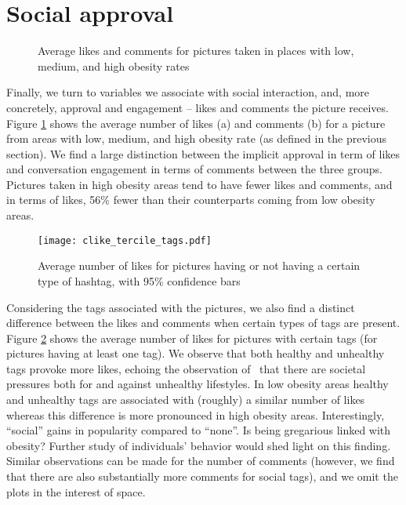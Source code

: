\documentclass{sig-alternate-2013}
\begin{document}
\section{Social approval}
\label{sec:social}


\begin{figure}[t!]
\hfill
{}\hfill
\caption{Average likes and comments for pictures taken in places with low, medium, and high obesity rates}
\label{figure:obesity_likes_comm}
\end{figure}

Finally, we turn to variables we associate with social interaction, and, more concretely, approval and engagement -- likes and comments the picture receives. Figure \ref{figure:obesity_likes_comm} shows the average number of likes (a) and comments (b) for a picture from areas with low, medium, and high obesity rate (as defined in the previous section). We find a large distinction between the implicit approval in term of likes and conversation engagement in terms of comments between the three groups. Pictures taken in high obesity areas tend to have fewer likes and comments, and in terms of likes, 56\% fewer than their counterparts coming from low obesity areas. 


\begin{figure}[t!]
\centering
\texttt{[image: clike\_tercile\_tags.pdf]}  
\caption{Average number of likes for pictures having or not having a certain type of hashtag, with 95\% confidence bars}
\label{figure:clike_ttypes}
\end{figure}

Considering the tags associated with the pictures, we also find a distinct difference between the likes and comments when certain types of tags are present. Figure \ref{figure:clike_ttypes} shows the average number of likes for pictures with certain tags (for pictures having at least one tag). We observe that both healthy and unhealthy tags provoke more likes, echoing the observation of~\cite{Adolescents} that there are societal pressures both for and against unhealthy lifestyles. In low obesity areas healthy and unhealthy tags are associated with (roughly) a similar number of likes whereas this difference is more pronounced in high obesity areas. Interestingly, ``social'' gains in popularity compared to ``none''. Is being gregarious linked with obesity? Further study of individuals' behavior would shed light on this finding. Similar observations can be made for the number of comments (however, we find that there are also substantially more comments for social tags), and we omit the plots in the interest of space.
\end{document}
